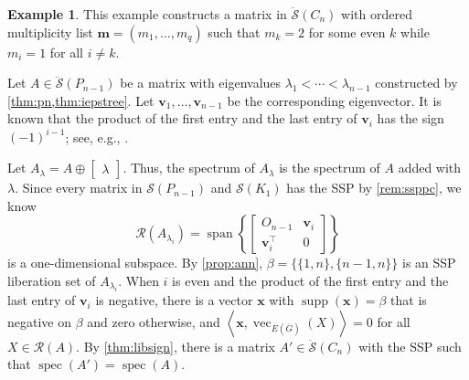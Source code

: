 \documentclass{article}
\theoremstyle{definition}
\newtheorem{example}[theorem]{Example}
\newcommand{\trans}{^\top}
\newcommand{\inp}[2]{\left\langle#1,#2\right\rangle}
\newcommand{\bx}{\mathbf{x}}
\newcommand{\bv}{\mathbf{v}}
\newcommand{\spec}{\operatorname{spec}}
\newcommand{\vspan}{\operatorname{span}}
\newcommand{\mptn}{\mathcal{S}}
\newcommand{\oml}{\mathbf{m}}
\newcommand{\mdso}{\ddot{\mathcal{S}}}
\newcommand{\vsupp}{\operatorname{supp}}
\newcommand{\mvec}{\operatorname{vec}}
\begin{document}
\begin{example}
\label{ex:libcn}
This example constructs a matrix in $\mdso(C_n)$ with ordered multiplicity list $\oml = (m_1, \ldots, m_q)$ such that $m_k = 2$ for some even $k$ while $m_i = 1$ for all $i \neq k$.  

Let $A\in\mdso(P_{n-1})$ be a matrix with eigenvalues $\lambda_1 < \cdots < \lambda_{n-1}$ constructed by \cref{thm:pn,thm:iepstree}.  Let $\bv_1, \ldots, \bv_{n-1}$ be the corresponding eigenvector.  It is known that the product of the first entry and the last entry of $\bv_i$ has the sign $(-1)^{i-1}$; see, e.g., \cite{Ferguson80, DPTZ19}.

Let $A_\lambda = A\oplus \begin{bmatrix}\lambda\end{bmatrix}$.  Thus, the spectrum of $A_\lambda$ is the spectrum of $A$ added with $\lambda$.  Since every matrix in $\mptn(P_{n-1})$ and $\mptn(K_1)$ has the SSP by \cref{rem:ssppc}, we know 
\[
    \mathcal{R}(A_{\lambda_i}) = \vspan\left\{\begin{bmatrix} O_{n-1} & \bv_i \\ \bv_i\trans & 0 \end{bmatrix}\right\}
\]
is a one-dimensional subspace.  By \cref{prop:ann}, $\beta = \{\{1,n\},\{n-1,n\}\}$ is an SSP liberation set of $A_{\lambda_i}$.  When $i$ is even and the product of the first entry and the last entry of $\bv_i$ is negative, there is a vector $\bx$ with $\vsupp(\bx) = \beta$ that is negative on $\beta$ and zero otherwise, and $\inp{\bx}{\mvec_{E(\overline{G})}(X)} = 0$ for all $X\in\mathcal{R}(A)$.  By \cref{thm:libsign}, there is a matrix $A'\in\mdso(C_n)$ with the SSP such that $\spec(A') = \spec(A)$.
\end{example}
\end{document}
